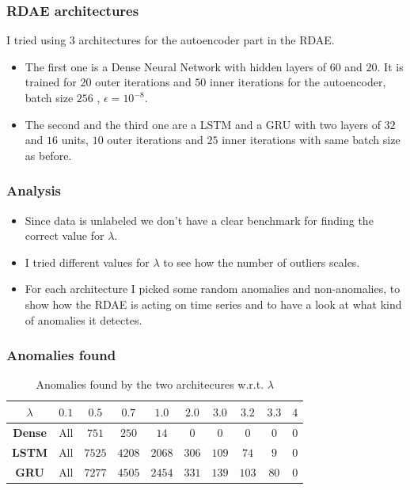 \documentclass{beamer}
\theoremstyle{plain}
\theoremstyle{definition}
\theoremstyle{remark}
\begin{document}
\begin{frame}
	\frametitle{RDAE architectures}
	I tried using $3$ architectures for the autoencoder part in the RDAE.
	\begin{itemize}
		\item The first one is a Dense Neural Network with hidden layers of $60$ and $20$. It is trained for $20$ outer iterations and $50$ inner iterations for the autoencoder, batch size $256$ , $\epsilon=10^{-8}$.
		\item The second and the third one are a LSTM and a GRU with two layers of $32$ and $16$ units, $10$ outer iterations and $25$ inner iterations with same batch size as before. 
	\end{itemize}
\end{frame}

\begin{frame}
	\frametitle{Analysis}
	\begin{itemize}
		\item Since data is unlabeled we don't have a clear benchmark for finding the correct value for $\lambda$.
		\item I tried different values for $\lambda$ to see how the number of outliers scales.
		\item For each architecture I picked some random anomalies and non-anomalies, to show how the RDAE is acting on time series and to have a look at what kind of anomalies it detectes.
	\end{itemize}
\end{frame}

\begin{frame}
	\frametitle{Anomalies found}
	\begin{table}[width=\linewidth]
		\begin{tabular}{|c|c|c|c|c|c|c|c|c|c|}
		\hline
		\textbf{$\lambda$} & \textbf{$0.1$} & \textbf{$0.5$} & \textbf{$0.7$} & \textbf{$1.0$}  & \textbf{$2.0$} & \textbf{$3.0$} & \textbf{$3.2$} & \textbf{$3.3$} & \textbf{$4$}\\ \hline
		\textbf{Dense} & All       & $751$          & $250$          & $14$     & $0$            & $0$            & $0$            & $0$            & $0$ \\ \hline
		\textbf{LSTM}  & All        & $7525$         & $4208$         & $2068$  & $306$          & $109$          & $74$           & $9$            & $0$ \\ \hline
		\textbf{GRU}  & All        & $7277$         & $4505$         & $2454$  & $331$          & $139$          & $103$           & $80$            & $0$ \\ \hline
		\end{tabular}
		\caption[]{Anomalies found by the two architecures w.r.t. $\lambda$}
	\end{table}
\end{frame}
\end{document}
